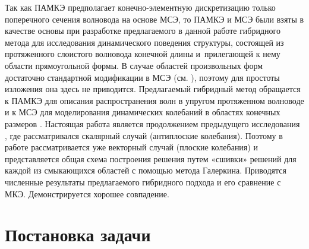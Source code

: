 \documentclass[press]{vestnik}
\begin{document}
Так как ПАМКЭ предполагает конечно-элементную дискретизацию только поперечного сечения волновода на основе МСЭ, то ПАМКЭ и МСЭ были взяты в качестве основы при разработке предлагаемого в данной работе гибридного метода для исследования динамического поведения структуры, состоящей из протяженного слоистого волновода конечной длины и~прилегающей к нему области прямоугольной формы. В случае областей произвольных форм достаточно стандартной модификации в МСЭ (см. \cite{Lisitsa,Bubenchikov}), поэтому для простоты изложения она здесь не приводится. Предлагаемый гибридный метод обращается к ПАМКЭ для описания распространения волн в упругом протяженном волноводе \cite{Bartoli} и к МСЭ для моделирования динамических колебаний в областях конечных размеров \cite{Shi,Bubenchikov,Golub_2015}. Настоящая работа является продолжением предыдущего исследования \cite{Khanazaryan}, где рассматривался скалярный случай (антиплоские колебания). Поэтому в работе рассматривается уже векторный случай (плоские колебания) и представляется общая схема построения решения путем «сшивки» решений для каждой из смыкающихся областей с помощью метода Галеркина. Приводятся численные результаты предлагаемого гибридного подхода и его сравнение с МКЭ. Демонстрируется хорошее совпадение.

\vspace{2mm}
\section{Постановка задачи}
\end{document}
